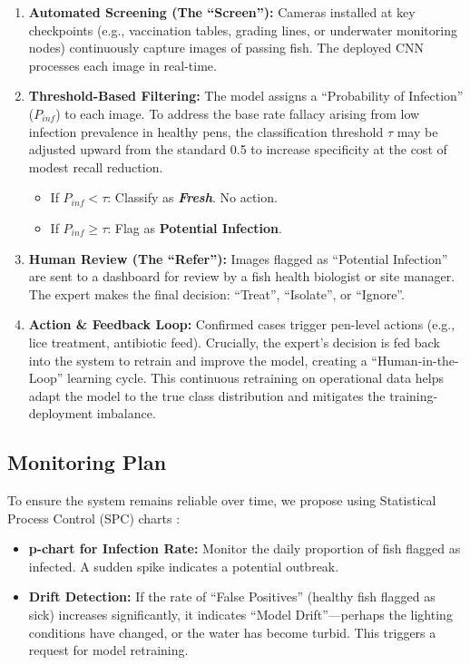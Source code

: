 \documentclass[12pt,a4paper]{article}
\begin{document}
\begin{enumerate}
    \item \textbf{Automated Screening (The ``Screen''):}
    Cameras installed at key checkpoints (e.g., vaccination tables, grading lines, or underwater monitoring nodes) continuously capture images of passing fish. The deployed CNN processes each image in real-time.
    \item \textbf{Threshold-Based Filtering:}
    The model assigns a ``Probability of Infection'' ($P_{inf}$) to each image. To address the base rate fallacy arising from low infection prevalence in healthy pens, the classification threshold $\tau$ may be adjusted upward from the standard 0.5 to increase specificity at the cost of modest recall reduction.
    \begin{itemize}
        \item If $P_{inf} < \tau$: Classify as \textbf{\emph{Fresh}}. No action.
        \item If $P_{inf} \ge \tau$: Flag as \textbf{Potential Infection}.
    \end{itemize}
    \item \textbf{Human Review (The ``Refer''):}
    Images flagged as ``Potential Infection'' are sent to a dashboard for review by a fish health biologist or site manager. The expert makes the final decision: ``Treat'', ``Isolate'', or ``Ignore''.
    \item \textbf{Action \& Feedback Loop:}
    Confirmed cases trigger pen-level actions (e.g., lice treatment, antibiotic feed). Crucially, the expert's decision is fed back into the system to retrain and improve the model, creating a ``Human-in-the-Loop'' learning cycle. This continuous retraining on operational data helps adapt the model to the true class distribution and mitigates the training-deployment imbalance.
\end{enumerate}

\subsection{Monitoring Plan}
To ensure the system remains reliable over time, we propose using Statistical Process Control (SPC) charts \citep{montgomery2020introduction}:
\begin{itemize}
    \item \textbf{p-chart for Infection Rate:} Monitor the daily proportion of fish flagged as infected. A sudden spike indicates a potential outbreak.
    \item \textbf{Drift Detection:} If the rate of ``False Positives'' (healthy fish flagged as sick) increases significantly, it indicates ``Model Drift''---perhaps the lighting conditions have changed, or the water has become turbid. This triggers a request for model retraining.
\end{itemize}
\end{document}
